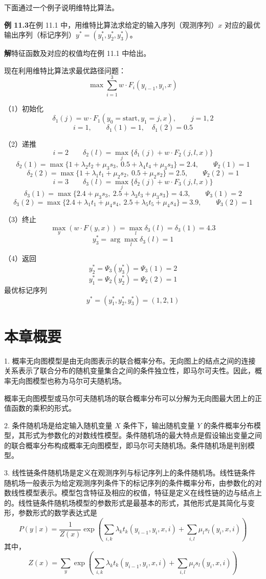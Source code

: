 \documentclass[UTF8,12pt,a4paper,fontset=fandol]{ctexart}
\begin{document}
下面通过一个例子说明维特比算法。

\noindent\textbf{例 11.3}\quad 在例 11.1 中，用维特比算法求给定的输入序列（观测序列）$x$ 对应的最优输出序列（标记序列）$y^*=(y_1^*,y_2^*,y_3^*)$。

\noindent\textbf{解}\quad 特征函数及对应的权值均在例 11.1 中给出。

现在利用维特比算法求最优路径问题：
\[
\max\sum_{i=1}^{3}w\cdot F_i(y_{i-1},y_i,x)
\]

（1）初始化
\[
\delta_1(j)=w\cdot F_1(y_0=\mathrm{start},y_1=j,x),\qquad j=1,2
\]
\[
i=1,\qquad \delta_1(1)=1,\quad \delta_1(2)=0.5
\]

（2）递推
\[
i=2\qquad \delta_2(l)=\max_j\{\delta_1(j)+w\cdot F_2(j,l,x)\}
\]
\[
\delta_2(1)=\max\{1+\lambda_2t_2+\mu_3s_3,\ 0.5+\lambda_4t_4+\mu_3s_3\}=2.4,\qquad \Psi_2(1)=1
\]
\[
\delta_2(2)=\max\{1+\lambda_1t_1+\mu_2s_2,\ 0.5+\mu_2s_2\}=2.5,\qquad \Psi_2(2)=1
\]
\[
i=3\qquad \delta_3(l)=\max_j\{\delta_2(j)+w\cdot F_3(j,l,x)\}
\]
\[
\delta_3(1)=\max\{2.4+\mu_3s_3,\ 2.5+\lambda_3t_3+\mu_3s_3\}=4.3,\qquad \Psi_3(1)=2
\]
\[
\delta_3(2)=\max\{2.4+\lambda_1t_1+\mu_4s_4,\ 2.5+\lambda_5t_5+\mu_4s_4\}=3.9,\qquad \Psi_3(2)=1
\]

（3）终止
\[
\max_y(w\cdot F(y,x))=\max_l\delta_3(l)=\delta_3(1)=4.3
\]
\[
y_3^*=\arg\max_l\delta_3(l)=1
\]

（4）返回
\[
y_2^*=\Psi_3(y_3^*)=\Psi_3(1)=2
\]
\[
y_1^*=\Psi_2(y_2^*)=\Psi_2(2)=1
\]
最优标记序列
\[
y^*=(y_1^*,y_2^*,y_3^*)=(1,2,1)
\]

\section*{本章概要}

1. 概率无向图模型是由无向图表示的联合概率分布。无向图上的结点之间的连接关系表示了联合分布的随机变量集合之间的条件独立性，即马尔可夫性。因此，概率无向图模型也称为马尔可夫随机场。

概率无向图模型或马尔可夫随机场的联合概率分布可以分解为无向图最大团上的正值函数的乘积的形式。

2. 条件随机场是给定输入随机变量 $X$ 条件下，输出随机变量 $Y$ 的条件概率分布模型，其形式为参数化的对数线性模型。条件随机场的最大特点是假设输出变量之间的联合概率分布构成概率无向图模型，即马尔可夫随机场。条件随机场是判别模型。

3. 线性链条件随机场是定义在观测序列与标记序列上的条件随机场。线性链条件随机场一般表示为给定观测序列条件下的标记序列的条件概率分布，由参数化的对数线性模型表示。模型包含特征及相应的权值，特征是定义在线性链的边与结点上的。线性链条件随机场模型的参数形式是最基本的形式，其他形式是其简化与变形，参数形式的数学表达式是
\[
P(y\mid x)=\frac{1}{Z(x)}\exp\left(
\sum_{i,k}\lambda_kt_k(y_{i-1},y_i,x,i)+
\sum_{i,l}\mu_ls_l(y_i,x,i)
\right)
\]
其中，
\[
Z(x)=\sum_y\exp\left(
\sum_{i,k}\lambda_kt_k(y_{i-1},y_i,x,i)+
\sum_{i,l}\mu_ls_l(y_i,x,i)
\right)
\]
\end{document}
